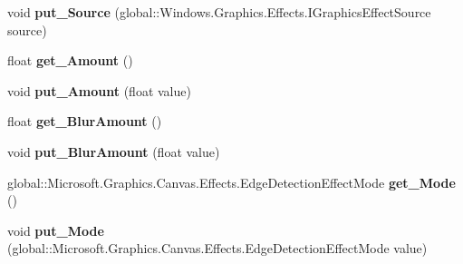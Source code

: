 \begin{DoxyCompactItemize}
void {\bfseries put\+\_\+\+Source} (global\+::\+Windows.\+Graphics.\+Effects.\+I\+Graphics\+Effect\+Source source)
\item 
\mbox{\label{interface_microsoft_1_1_graphics_1_1_canvas_1_1_effects_1_1_i_edge_detection_effect_a4e9c33fd362cec60d6638ddd1aeadaab}} 
float {\bfseries get\+\_\+\+Amount} ()
\item 
\mbox{\label{interface_microsoft_1_1_graphics_1_1_canvas_1_1_effects_1_1_i_edge_detection_effect_a25aa355d10926221fb18d7b5ab5d121b}} 
void {\bfseries put\+\_\+\+Amount} (float value)
\item 
\mbox{\label{interface_microsoft_1_1_graphics_1_1_canvas_1_1_effects_1_1_i_edge_detection_effect_a34600b9441ec9b1822069023c004b06d}} 
float {\bfseries get\+\_\+\+Blur\+Amount} ()
\item 
\mbox{\label{interface_microsoft_1_1_graphics_1_1_canvas_1_1_effects_1_1_i_edge_detection_effect_ae34ee491a4a76a40ac93a1257d408521}} 
void {\bfseries put\+\_\+\+Blur\+Amount} (float value)
\item 
\mbox{\label{interface_microsoft_1_1_graphics_1_1_canvas_1_1_effects_1_1_i_edge_detection_effect_af4eed9893a7039265777bc63d06a5dad}} 
global\+::\+Microsoft.\+Graphics.\+Canvas.\+Effects.\+Edge\+Detection\+Effect\+Mode {\bfseries get\+\_\+\+Mode} ()
\item 
\mbox{\label{interface_microsoft_1_1_graphics_1_1_canvas_1_1_effects_1_1_i_edge_detection_effect_ab506181e7ae373678c372e670ca4e7dc}} 
void {\bfseries put\+\_\+\+Mode} (global\+::\+Microsoft.\+Graphics.\+Canvas.\+Effects.\+Edge\+Detection\+Effect\+Mode value)
\item 
\mbox{\label{interface_microsoft_1_1_graphics_1_1_canvas_1_1_effects_1_1_i_edge_detection_effect_a3d82aa6e19802e82c6cfe865d511e72f}} 

\end{DoxyCompactItemize}
